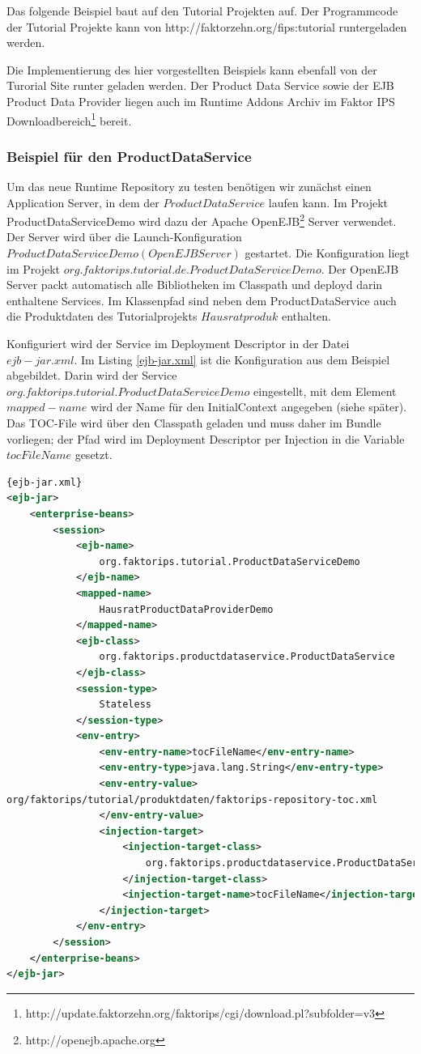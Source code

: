 \documentclass[headsepline=true, footsepline=true]{scrartcl}
\begin{document}
Das folgende Beispiel baut auf den Tutorial Projekten auf. Der Programmcode der
Tutorial Projekte kann von http://faktorzehn.org/fips:tutorial runtergeladen
werden. 

Die Implementierung des hier vorgestellten Beispiels kann ebenfall
von der Turorial Site runter geladen werden.
Der Product Data Service sowie der EJB Product Data Provider liegen auch im Runtime Addons Archiv
im Faktor IPS
Downloadbereich\footnote{http://update.faktorzehn.org/faktorips/cgi/download.pl?subfolder=v3} bereit.

\subsubsection{Beispiel für den ProductDataService}

Um das neue Runtime Repository zu testen benötigen wir zunächst einen
Application Server, in dem der $ProductDataService$ laufen kann. Im
Projekt ProductDataServiceDemo wird dazu der Apache
OpenEJB\footnote{http://openejb.apache.org} Server verwendet. 
Der Server wird über die Launch-Konfiguration $ProductDataServiceDemo (OpenEJB
Server)$ gestartet. Die Konfiguration liegt im Projekt
$org.faktorips.tutorial.de.ProductDataServiceDemo$.
Der OpenEJB Server packt automatisch alle Bibliotheken im Classpath und deployd
darin enthaltene Services. Im Klassenpfad sind neben dem ProductDataService auch die Produktdaten
des Tutorialprojekts $Hausratproduk$ enthalten.

Konfiguriert wird der Service im Deployment Descriptor in der Datei
$ejb-jar.xml$. Im Listing \ref{ejb-jar.xml} ist die Konfiguration aus dem
Beispiel abgebildet. Darin wird der Service
$org.faktorips.tutorial.ProductDataServiceDemo$
eingestellt, mit dem Element $mapped-name$ wird der Name für den InitialContext
angegeben (siehe später). Das TOC-File wird über den Classpath geladen und muss
daher im Bundle vorliegen; der Pfad wird im Deployment Descriptor per Injection
in die Variable $tocFileName$ gesetzt.

\begin{lstlisting}[caption=Beispiel einer ejb-jar.xml, label=ejb-jar.xml,language=XML]{ejb-jar.xml}
<ejb-jar>
	<enterprise-beans>
		<session>
			<ejb-name>
				org.faktorips.tutorial.ProductDataServiceDemo
			</ejb-name>
			<mapped-name>
				HausratProductDataProviderDemo
			</mapped-name>
			<ejb-class>
				org.faktorips.productdataservice.ProductDataService
			</ejb-class>
			<session-type>
				Stateless
			</session-type>
			<env-entry>
				<env-entry-name>tocFileName</env-entry-name>
				<env-entry-type>java.lang.String</env-entry-type>
				<env-entry-value>
org/faktorips/tutorial/produktdaten/faktorips-repository-toc.xml
				</env-entry-value>
				<injection-target>
					<injection-target-class>
						org.faktorips.productdataservice.ProductDataService
					</injection-target-class>
					<injection-target-name>tocFileName</injection-target-name>
				</injection-target>
			</env-entry>
		</session>
	</enterprise-beans>
</ejb-jar>
\end{lstlisting}
\end{document}
